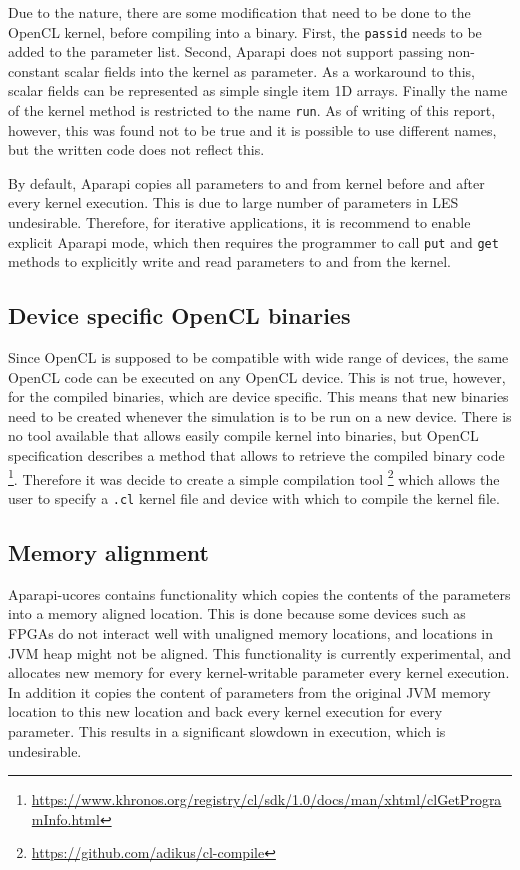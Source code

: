 \documentclass{l4proj}
\begin{document}
Due to the nature, there are some modification that need to be done to the OpenCL
kernel, before compiling into a binary. First, the \texttt{passid} needs to be added to
the parameter list. Second, Aparapi does not support passing non-constant scalar fields
into the kernel as parameter. As a workaround to this, scalar fields can be represented
as simple single item 1D arrays. Finally the name of the kernel method is restricted to
the name \texttt{run}. As of writing of this report, however, this was found not to be true
and it is possible to use different names, but the written code does not reflect this.

By default, Aparapi copies all parameters to and from kernel before and after every kernel
execution. This is due to large number of parameters in LES undesirable. Therefore, for
iterative applications, it is recommend to enable explicit Aparapi mode, which then requires
the programmer to call \texttt{put} and \texttt{get} methods to explicitly write and read 
parameters to and from the kernel.

\subsection{Device specific OpenCL binaries}

Since OpenCL is supposed to be compatible with wide range of devices, the same OpenCL
code can be executed on any OpenCL device. This is not true, however, for the 
compiled binaries, which are device specific. This means that new binaries need to 
be created whenever the simulation is to be run on a new device. There is no
tool available that allows easily compile kernel into binaries, but OpenCL specification
describes a method that allows to retrieve the compiled binary code
\footnote{\url{https://www.khronos.org/registry/cl/sdk/1.0/docs/man/xhtml/clGetProgramInfo.html}}.
Therefore it was decide to create a simple compilation tool 
\footnote{\url{https://github.com/adikus/cl-compile}}
which allows the user to specify a \texttt{.cl} kernel file and device with which to
compile the kernel file.

\subsection{Memory alignment}

Aparapi-ucores contains functionality which copies the contents of the parameters
into a memory aligned location. This is done because some devices such as FPGAs
do not interact well with unaligned memory locations, and locations in JVM heap
might not be aligned. This functionality is currently experimental, and allocates 
new memory for every kernel-writable parameter every kernel execution. In addition
it copies the content of parameters from the original JVM memory location to this new 
location and back every kernel execution for every parameter. This results in a significant 
slowdown in execution, which is undesirable.
\end{document}
